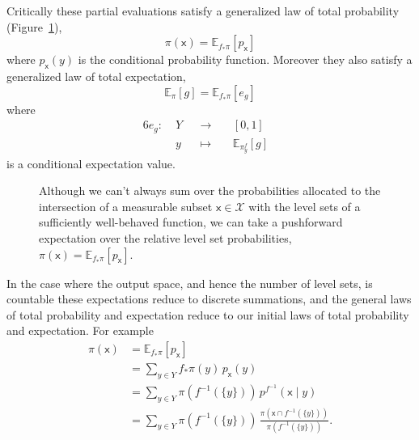 \documentclass[
  letterpaper,
  DIV=11,
  numbers=noendperiod]{scrartcl}
\begin{document}
Critically these partial evaluations satisfy a generalized law of total
probability (Figure~\ref{fig-general-total-probability}), \[
\pi( \mathsf{x} ) = \mathbb{E}_{f_{*} \pi} [ p_{\mathsf{x}} ]
\] where \(p_{\mathsf{x}}(y)\) is the conditional probability function.
Moreover they also satisfy a generalized law of total expectation, \[
\mathbb{E}_{\pi}[g]
=
\mathbb{E}_{f_{*} \pi} [ e_{g} ]
\] where \begin{alignat*}{6}
e_{g} :\; &Y& &\rightarrow& \; &[0, 1]&
\\
&y& &\mapsto& &\mathbb{E}_{\pi^{f}_{y} }[ g ] &
\end{alignat*} is a conditional expectation value.

\begin{figure}


\caption{\label{fig-general-total-probability}Although we can't always
sum over the probabilities allocated to the intersection of a measurable
subset \(\mathsf{x} \in \mathcal{X}\) with the level sets of a
sufficiently well-behaved function, we can take a pushforward
expectation over the relative level set probabilities,
\(\pi(\mathsf{x}) = \mathbb{E}_{f_{*} \pi} [ p_{\mathsf{x}}]\).}

\end{figure}%

In the case where the output space, and hence the number of level sets,
is countable these expectations reduce to discrete summations, and the
general laws of total probability and expectation reduce to our initial
laws of total probability and expectation. For example \begin{align*}
\pi( \mathsf{x} )
&=
\mathbb{E}_{f_{*} \pi} [ p_{\mathsf{x}} ]
\\
&=
\sum_{y \in Y} f_{*} \pi(y) \, p_{\mathsf{x}}(y)
\\
&=
\sum_{y \in Y} \pi( f^{-1}( \{ y \} ) ) \, p^{f^{-1}}(\mathsf{x} \mid y)
\\
&=
\sum_{y \in Y} \pi( f^{-1}( \{ y \} ) ) \,
\frac{ \pi( \mathsf{x} \cap f^{-1}( \{ y \} ) )}
{ \pi( f^{-1}( \{ y \} ) ) }.
\end{align*}
\end{document}
